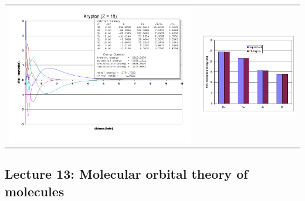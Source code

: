\documentclass[11pt]{article}
\begin{document}
\begin{table}
\begin{tabular}{cc}
\includegraphics[scale=0.33]{Images/Slide5.png} & \includegraphics[scale=0.5]{Images/Slide6.png} 
\end{tabular}
\end{table}

\subsection{Lecture 13: Molecular orbital theory of molecules}
\label{sec:org22f31ab}
\end{document}
